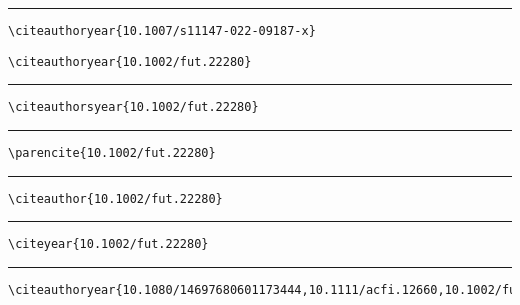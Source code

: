 \documentclass[12pt, a4paper, oneside]{article}
\begin{document}
\vspace{1em}
\hrule
\vspace{1em}

\begin{verbatim}
\citeauthoryear{10.1007/s11147-022-09187-x}
\end{verbatim}

\begin{verbatim}
\citeauthoryear{10.1002/fut.22280}
\end{verbatim}



\vspace{1em}
\hrule
\vspace{1em}

\begin{verbatim}
\citeauthorsyear{10.1002/fut.22280}
\end{verbatim}




\vspace{1em}
\hrule
\vspace{1em}

\begin{verbatim}
\parencite{10.1002/fut.22280}
\end{verbatim}
\parencite{10.1002/fut.22280}

\vspace{1em}
\hrule
\vspace{1em}

\begin{verbatim}
\citeauthor{10.1002/fut.22280}
\end{verbatim}
\citeauthor{10.1002/fut.22280}

\vspace{1em}
\hrule
\vspace{1em}

\begin{verbatim}
\citeyear{10.1002/fut.22280}
\end{verbatim}
\citeyear{10.1002/fut.22280}

\vspace{1em}
\hrule
\vspace{1em}

\begin{verbatim}
\citeauthoryear{10.1080/14697680601173444,10.1111/acfi.12660,10.1002/fut.22280}
\end{verbatim}
\end{document}
